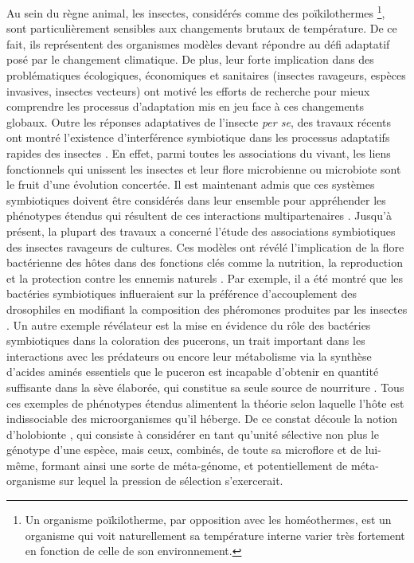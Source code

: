 Au sein du règne animal, les insectes, considérés comme des poïkilothermes%
\footnote{Un organisme poïkilotherme, par opposition avec les homéothermes, est un organisme qui voit naturellement sa température interne varier très fortement en fonction de celle de son environnement.},
sont particulièrement sensibles aux changements brutaux de température.
De ce fait, ils représentent des organismes modèles devant répondre au défi adaptatif posé par le changement climatique.
De plus, leur forte implication dans des problématiques écologiques, économiques et sanitaires (insectes ravageurs, espèces invasives, insectes vecteurs) ont motivé les efforts de recherche pour mieux comprendre les processus d'adaptation mis en jeu face à ces changements globaux.
Outre les réponses adaptatives de l'insecte \textit{per se}, des travaux récents ont montré l'existence d'interférence symbiotique dans les processus adaptatifs rapides des insectes \cite{feldhaar2011}.
En effet, parmi toutes les associations du vivant, les liens fonctionnels qui unissent les insectes et leur flore microbienne ou microbiote sont le fruit d'une évolution concertée.
Il est maintenant admis que ces systèmes symbiotiques doivent être considérés dans leur ensemble pour appréhender les phénotypes étendus qui résultent de ces interactions multipartenaires \cite{feldhaar2011}.
Jusqu'à présent, la plupart des travaux a concerné l'étude des  associations  symbiotiques  des  insectes  ravageurs  de  cultures.
Ces  modèles  ont  révélé  l'implication  de  la  flore  bactérienne  des  hôtes  dans  des  fonctions  clés  comme  la nutrition, la reproduction et la protection contre les ennemis naturels \cite{dillondillon}.
Par exemple, il a été montré que les bactéries symbiotiques influeraient sur la préférence d'accouplement des drosophiles en modifiant la composition des phéromones produites par les insectes \cite{sharon2010}.
Un autre exemple révélateur est la mise en évidence du rôle des bactéries symbiotiques dans la coloration des pucerons, un trait important dans les interactions avec les prédateurs \cite{tsuchida2010} ou encore leur métabolisme via la synthèse d'acides aminés essentiels que le puceron est incapable d'obtenir en quantité suffisante dans la sève élaborée, qui constitue sa seule source de nourriture \cite{douglas1998}.
Tous ces exemples de phénotypes étendus alimentent la théorie selon laquelle l'hôte est indissociable des microorganismes qu'il héberge.
De ce constat découle la notion d'holobionte \cite{rosenberg2007}, qui consiste à considérer en tant qu'unité sélective non plus le génotype d'une espèce, mais ceux, combinés, de toute sa microflore et de lui-même, formant ainsi une sorte de méta-génome, et potentiellement de méta-organisme sur lequel la pression de sélection s'exercerait.

